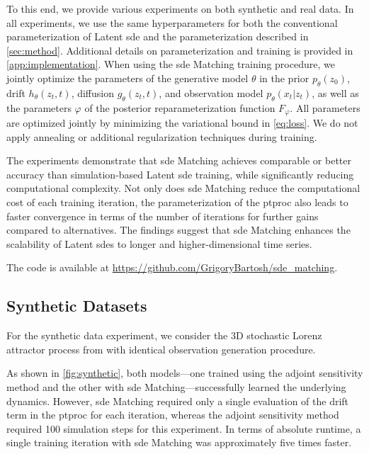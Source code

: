 \documentclass{article}
\def\ph{\varphi}
\def\th{\theta}
\theoremstyle{plain}
\theoremstyle{definition}
\theoremstyle{remark}
\begin{document}
To this end, we provide various experiments on both synthetic and real data. In all experiments, we use the same hyperparameters for both the conventional parameterization of Latent \gls{sde} and the parameterization described in \cref{sec:method}. Additional details on parameterization and training is provided in \cref{app:implementation}. When using the \gls{sde} Matching training procedure, we jointly optimize the parameters of the generative model $\th$ in the prior $p_\th(z_0)$, drift $h_\th(z_t, t)$, diffusion $g_\th(z_t, t)$, and observation model $p_\th(x_t|z_t)$, as well as the parameters $\ph$ of the posterior reparameterization function $F_\ph$. All parameters are optimized jointly by minimizing the variational bound in \cref{eq:loss}. We do not apply annealing or additional regularization techniques during training.


The experiments demonstrate that \gls{sde} Matching achieves comparable or better accuracy than simulation-based Latent \gls{sde} training, while significantly reducing computational complexity. Not only does \gls{sde} Matching reduce the computational cost of each training iteration, the parameterization of the \gls{ptproc} also leads to faster convergence in terms of the number of iterations for further gains compared to alternatives. The findings suggest that \gls{sde} Matching enhances the scalability of Latent \glspl{sde} to longer and higher-dimensional time series.

The code is available at \url{https://github.com/GrigoryBartosh/sde_matching}.


\subsection{Synthetic Datasets}
\label{sec:lorenz}


For the synthetic data experiment, we consider the 3D stochastic Lorenz attractor process from \citet{li2020scalable} with identical observation generation procedure. 

As shown in \cref{fig:synthetic}, both models—one trained using the adjoint sensitivity method and the other with \gls{sde} Matching—successfully learned the underlying dynamics. However, \gls{sde} Matching required only a single evaluation of the drift term in the \gls{ptproc} for each iteration, whereas the adjoint sensitivity method required 100 simulation steps for this experiment. In terms of absolute runtime, a single training iteration with \gls{sde} Matching was approximately five times faster.
\end{document}
